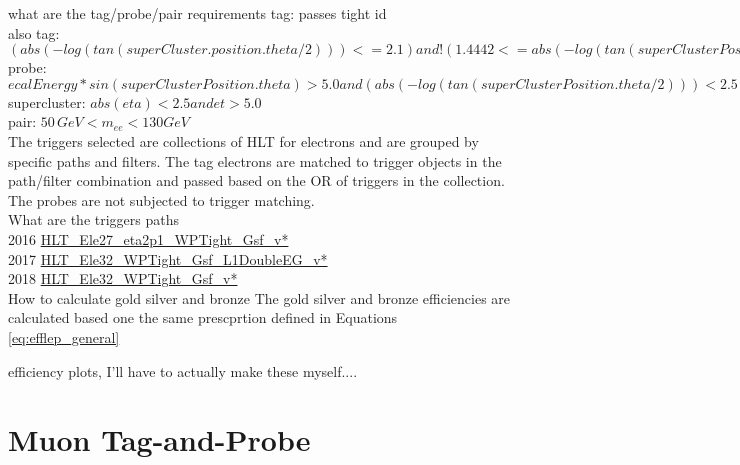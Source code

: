 what are the tag/probe/pair requirements
tag: passes tight id \\ 
also tag: $(abs(-log(tan(superCluster.position.theta/2)))<=2.1) and !(1.4442<=abs(-log(tan(superClusterPosition.theta/2)))<=1.566) and pt >= 30.0$ \\
probe: $ecalEnergy*sin(superClusterPosition.theta)>5.0 and  (abs(-log(tan(superClusterPosition.theta/2)))<2.5)$
supercluster: $abs(eta)<2.5 and  et>5.0$ \\
pair: $50 \, GeV<m_{ee}<130 GeV$ \\

The triggers selected are collections of HLT for electrons and are grouped by specific paths and filters. The tag electrons are matched to trigger objects in the path/filter combination and passed based on the OR of triggers in the collection. The probes are not subjected to trigger matching.\\

What are the triggers paths\\ 
2016 \url{HLT_Ele27_eta2p1_WPTight_Gsf_v*}\\
2017 \url{HLT_Ele32_WPTight_Gsf_L1DoubleEG_v*}\\
2018 \url{HLT_Ele32_WPTight_Gsf_v*}\\

How to calculate gold silver and bronze
The gold silver and bronze efficiencies are calculated  based one the same prescprtion defined in Equations \ref{eq:efflep_general}

efficiency plots, I'll have to actually make these myself....

\section{Muon Tag-and-Probe}

